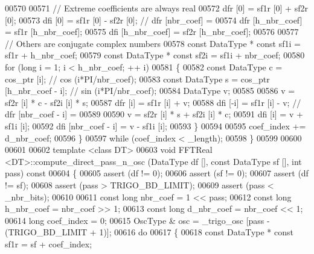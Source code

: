 \begin{DoxyCode}
00570 
00571         \textcolor{comment}{// Extreme coefficients are always real}
00572         dfr [0] = sf1r [0] + sf2r [0];
00573         dfi [0] = sf1r [0] - sf2r [0];  \textcolor{comment}{// dfr [nbr\_coef] =}
00574         dfr [h\_nbr\_coef] = sf1r [h\_nbr\_coef];
00575         dfi [h\_nbr\_coef] = sf2r [h\_nbr\_coef];
00576 
00577         \textcolor{comment}{// Others are conjugate complex numbers}
00578         \textcolor{keyword}{const} DataType * \textcolor{keyword}{const}  sf1i = sf1r + h\_nbr\_coef;
00579         \textcolor{keyword}{const} DataType * \textcolor{keyword}{const}  sf2i = sf1i + nbr\_coef;
00580         \textcolor{keywordflow}{for} (\textcolor{keywordtype}{long} i = 1; i < h\_nbr\_coef; ++ i)
00581         \{
00582             \textcolor{keyword}{const} DataType  c = cos\_ptr [i];                    \textcolor{comment}{// cos (i*PI/nbr\_coef);}
00583             \textcolor{keyword}{const} DataType  s = cos\_ptr [h\_nbr\_coef - i];   \textcolor{comment}{// sin (i*PI/nbr\_coef);}
00584             DataType            v;
00585 
00586             v = sf2r [i] * c - sf2i [i] * s;
00587             dfr [i] = sf1r [i] + v;
00588             dfi [-i] = sf1r [i] - v;    \textcolor{comment}{// dfr [nbr\_coef - i] =}
00589 
00590             v = sf2r [i] * s + sf2i [i] * c;
00591             dfi [i] = v + sf1i [i];
00592             dfi [nbr\_coef - i] = v - sf1i [i];
00593         \}
00594 
00595         coef\_index += d\_nbr\_coef;
00596     \}
00597     \textcolor{keywordflow}{while} (coef\_index < \_length);
00598 \}
00599 
00600 
00601 
00602 \textcolor{keyword}{template} <\textcolor{keyword}{class} DT>
00603 \textcolor{keywordtype}{void}    FFTReal <DT>::compute\_direct\_pass\_n\_osc (DataType df [], \textcolor{keyword}{const} DataType sf [], \textcolor{keywordtype}{int} pass) \textcolor{keyword}{const}
00604 \{
00605     assert (df != 0);
00606     assert (sf != 0);
00607     assert (df != sf);
00608     assert (pass > TRIGO\_BD\_LIMIT);
00609     assert (pass < \_nbr\_bits);
00610 
00611     \textcolor{keyword}{const} \textcolor{keywordtype}{long}      nbr\_coef = 1 << pass;
00612     \textcolor{keyword}{const} \textcolor{keywordtype}{long}      h\_nbr\_coef = nbr\_coef >> 1;
00613     \textcolor{keyword}{const} \textcolor{keywordtype}{long}      d\_nbr\_coef = nbr\_coef << 1;
00614     \textcolor{keywordtype}{long}                coef\_index = 0;
00615     OscType &       osc = \_trigo\_osc [pass - (TRIGO\_BD\_LIMIT + 1)];
00616     \textcolor{keywordflow}{do}
00617     \{
00618         \textcolor{keyword}{const} DataType  * \textcolor{keyword}{const} sf1r = sf + coef\_index;

\end{DoxyCode}
